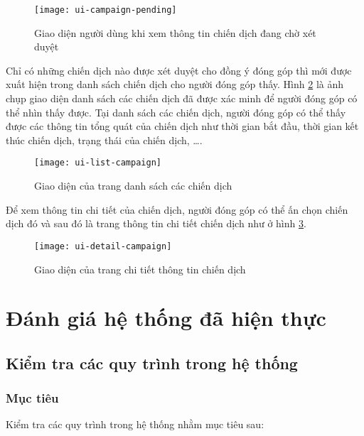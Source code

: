 \documentclass[../main-report.tex]{subfiles}
\begin{document}
\begin{figure}[ht!]
\begin{center}
\label{fig:ui-campaign-pending}
\texttt{[image: ui-campaign-pending]}
\caption{Giao diện người dùng khi xem thông tin chiến dịch đang chờ xét duyệt}
\end{center}
\end{figure}

Chỉ có những chiến dịch nào được xét duyệt cho đồng ý đóng góp thì mới được xuất hiện trong danh sách chiến dịch cho người đóng góp thấy. Hình \ref{fig:ui-list-campaign} là ảnh chụp giao diện danh sách các chiến dịch đã được xác minh để người đóng góp có thể nhìn thấy được. Tại danh sách các chiến dịch, người đóng góp có thể thấy được các thông tin tổng quát của chiến dịch như thời gian bắt đầu, thời gian kết thúc chiến dịch, trạng thái của chiến dịch, \ldots.

\begin{figure}[ht!]
\begin{center}
\label{fig:ui-list-campaign}
\texttt{[image: ui-list-campaign]}
\caption{Giao diện của trang danh sách các chiến dịch}
\end{center}
\end{figure}

Để xem thông tin chi tiết của chiến dịch, người đóng góp có thể ấn chọn chiến dịch đó và sau đó là trang thông tin chi tiết chiến dịch như ở hình \ref{fig:ui-detail-campaign}.

\begin{figure}[ht!]
\begin{center}
\label{fig:ui-detail-campaign}
\texttt{[image: ui-detail-campaign]}
\caption{Giao diện của trang chi tiết thông tin chiến dịch}
\end{center}
\end{figure}

\section{Đánh giá hệ thống đã hiện thực}
\subsection{Kiểm tra các quy trình trong hệ thống}
\subsubsection{Mục tiêu}
Kiểm tra các quy trình trong hệ thống nhằm mục tiêu sau:
\end{document}
